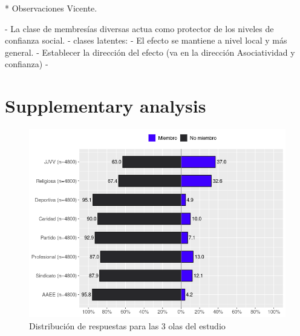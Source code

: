 * Observaciones Vicente. 

- La clase de membresías diversas actua como protector de los niveles de confianza social. 
- clases latentes: 
- El efecto se mantiene a nivel local y más general. 
- Establecer la dirección del efecto (va en la dirección Asociatividad y confianza) 
- 

\newpage

\printbibliography

\newpage

\section{Supplementary analysis}

\begin{figure}[H]
    \centering
    \includegraphics[width=13cm]{output/plot_items.png}
    \caption{Distribución de respuestas para las 3 olas del estudio}
    \label{fig:likert}
\end{figure}


